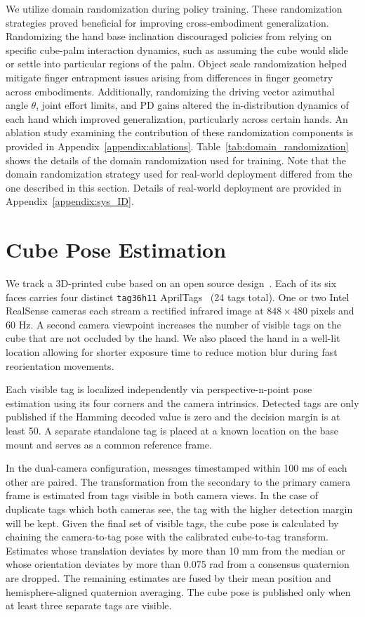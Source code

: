 We utilize domain randomization during policy training. These randomization strategies proved beneficial for improving cross-embodiment generalization. Randomizing the hand base inclination discouraged policies from relying on specific cube-palm interaction dynamics, such as assuming the cube would slide or settle into particular regions of the palm. Object scale randomization helped mitigate finger entrapment issues arising from differences in finger geometry across embodiments. Additionally, randomizing the driving vector azimuthal angle $\theta$, joint effort limits, and PD gains altered the in-distribution dynamics of each hand which improved generalization, particularly across certain hands. An ablation study examining the contribution of these randomization components is provided in Appendix~\ref{appendix:ablations}. Table~\ref{tab:domain_randomization} shows the details of the domain randomization used for training. Note that the domain randomization strategy used for real-world deployment differed from the one described in this section. Details of real-world deployment are provided in Appendix~\ref{appendix:sys_ID}.




\section{Cube Pose Estimation}
\label{appendix:cube_pose}

We track a 3D-printed cube based on an open source design~\cite{park2026aprilcube}. Each of its six faces carries four distinct \texttt{tag36h11} AprilTags~\cite{apriltag} (24 tags total). One or two Intel RealSense cameras each stream a rectified infrared image at $848\times480$ pixels and 60 Hz. A second camera viewpoint increases the number of visible tags on the cube that are not occluded by the hand. We also placed the hand in a well-lit location allowing for shorter exposure time to reduce motion blur during fast reorientation movements.

Each visible tag is localized independently via perspective-n-point pose estimation using its four corners and the camera intrinsics. Detected tags are only published if the Hamming decoded value is zero and the decision margin is at least 50. A separate standalone tag is placed at a known location on the base mount and serves as a common reference frame.

In the dual-camera configuration, messages timestamped within 100 ms of each other are paired. The transformation from the secondary to the primary camera frame is estimated from tags visible in both camera views. In the case of duplicate tags which both cameras see, the tag with the higher detection margin will be kept. Given the final set of visible tags, the cube pose is calculated by chaining the camera-to-tag pose with the calibrated cube-to-tag transform. Estimates whose translation deviates by more than 10 mm from the median or whose orientation deviates by more than 0.075 rad from a consensus quaternion are dropped. The remaining estimates are fused by their mean position and hemisphere-aligned quaternion averaging. The cube pose is published only when at least three separate tags are visible.

